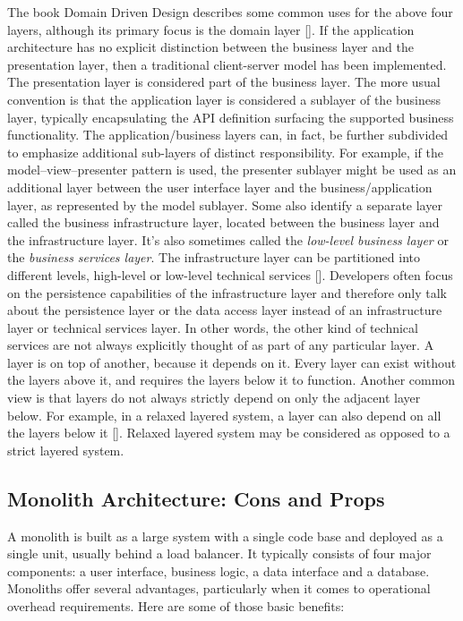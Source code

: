 The book Domain Driven Design describes some common uses for the above four layers, although its primary focus is the
domain layer [\cite{solvberg2010domain}].
If the application architecture has no explicit distinction between the business layer and the presentation layer,
then a traditional client-server model has been implemented.
The presentation layer is considered part of the business layer.
The more usual convention is that the application layer is considered a sublayer of the business layer,
typically encapsulating the API definition surfacing the supported business functionality.
The application/business layers can, in fact, be further subdivided to emphasize additional sub-layers of distinct
responsibility.
For example, if the model–view–presenter pattern is used, the presenter sublayer might be used as an additional layer
between the user interface layer and the business/application layer, as represented by the model sublayer.
Some also identify a separate layer called the business infrastructure layer, located between the business layer
and the infrastructure layer.
It's also sometimes called the \textit{low-level business layer} or the \textit{business services layer}.
The infrastructure layer can be partitioned into different levels, high-level or low-level technical services [\cite{dennis2018mcapl}].
Developers often focus on the persistence capabilities of the infrastructure layer and therefore only
talk about the persistence layer or the data access layer instead of an infrastructure layer or technical services layer.
In other words, the other kind of technical services are not always explicitly thought of as part of any particular layer.
A layer is on top of another, because it depends on it.
Every layer can exist without the layers above it, and requires the layers below it to function.
Another common view is that layers do not always strictly depend on only the adjacent layer below.
For example, in a relaxed layered system, a layer can also depend on all the layers below it [\cite{anon2014building}].
Relaxed layered system may be considered as opposed to a strict layered system.

\subsection{Monolith Architecture: Cons and Props}\label{subsec:monolith-architecture:-cons-and-props}

A monolith is built as a large system with a single code base and deployed as a single unit, usually behind a load balancer.
It typically consists of four major components: a user interface, business logic, a data interface and a database.
Monoliths offer several advantages, particularly when it comes to operational overhead requirements.
Here are some of those basic benefits:


